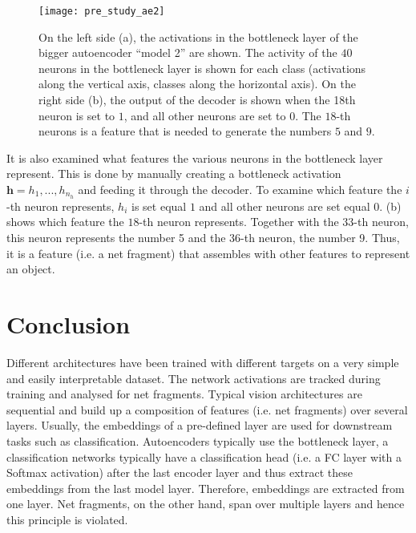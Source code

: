 \begin{figure}[h]
    \centering
    \texttt{[image: pre\_study\_ae2]}
    \caption[Network activations of the bigger autoencoder model]{On the left side (a), the activations in the bottleneck layer of the bigger autoencoder ``model 2'' are shown. The activity of the $40$ neurons in the bottleneck layer is shown for each class (activations along the vertical axis, classes along the horizontal axis). On the right side (b), the output of the decoder is shown when the 18th neuron is set to $1$, and all other neurons are set to $0$. The $18$-th neurons is a feature that is needed to generate the numbers $5$ and $9$.}
\end{figure}

It is also examined what features the various neurons in the bottleneck layer represent.
This is done by manually creating a bottleneck activation $\boldsymbol{h} = h_1, ..., h_{n_h}$ and feeding it through the decoder.
To examine which feature the $i$-th neuron represents, $h_i$ is set equal $1$ and all other neurons are set equal $0$.
 (b) shows which feature the $18$-th neuron represents. Together with the $33$-th neuron, this neuron represents the number 5 and the $36$-th neuron, the number 9.
Thus, it is a feature (i.e. a net fragment) that assembles with other features to represent an object.

\section{Conclusion}
Different architectures have been trained with different targets on a very simple and easily interpretable dataset.
The network activations are tracked during training and analysed for net fragments.
Typical vision architectures are sequential and build up a composition of features (i.e. net fragments) over several layers.
Usually, the embeddings of a pre-defined layer are used for downstream tasks such as classification.
Autoencoders typically use the bottleneck layer, a classification networks typically have a classification head (i.e. a FC layer with a Softmax activation) after the last encoder layer and thus extract these embeddings from the last model layer.
Therefore, embeddings are extracted from one layer.
Net fragments, on the other hand, span over multiple layers and hence this principle is violated.

